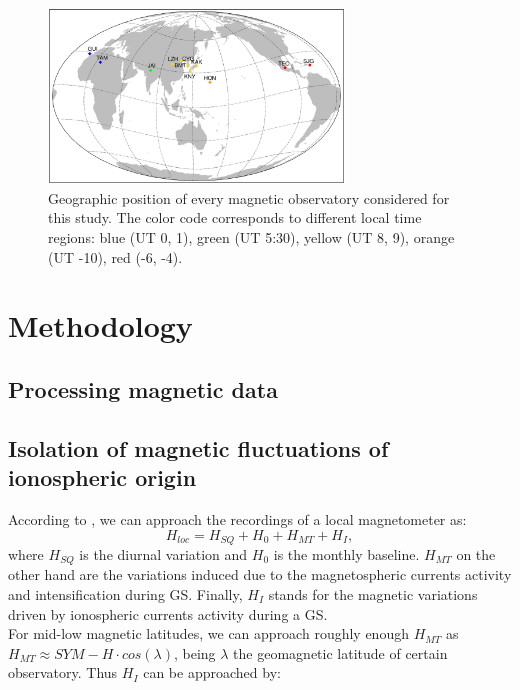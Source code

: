 \documentclass[a4paper]{article}
\theoremstyle{plain}
\theoremstyle{definition}
\begin{document}
\begin{figure}
	\centering
	\includegraphics[width=0.7\textwidth]{fig/map.eps}
	\caption{Geographic position of every magnetic observatory considered for this study. The color code corresponds to different local time regions: blue (UT 0, 1), green (UT 5:30), yellow (UT 8, 9), orange (UT -10), red (-6, -4).}
	\label{fig:map}
\end{figure}


	\section{Methodology}
	\label{sec:method}
	\subsection{Processing magnetic data}
	
	\subsection{Isolation of magnetic fluctuations of ionospheric origin}
	According to \cite{1969intro_to_iono_p, l_handbook_geof_sw_Geom_field, baseline_Gjerloev, vanKampt}, we can approach the recordings of a local magnetometer as:
	\begin{equation}
		H_{loc} = H_{SQ} + H_0 + H_{MT} + H_{I},
	\end{equation}
	\noindent where $H_{SQ}$ is the diurnal variation and $H_0$ is the monthly baseline. $H_{MT}$ on the other hand are the variations induced due to the magnetospheric currents activity and intensification during GS. Finally, $H_I$ stands for the magnetic variations driven by ionospheric currents activity during a GS.\\
	
	For mid-low magnetic latitudes, we can approach roughly enough $H_{MT}$ as $H_{MT} \approx SYM - H \cdot cos(\lambda)$, being $\lambda$ the geomagnetic latitude of certain observatory. Thus $H_I$ can be approached by:
	
\end{document}
